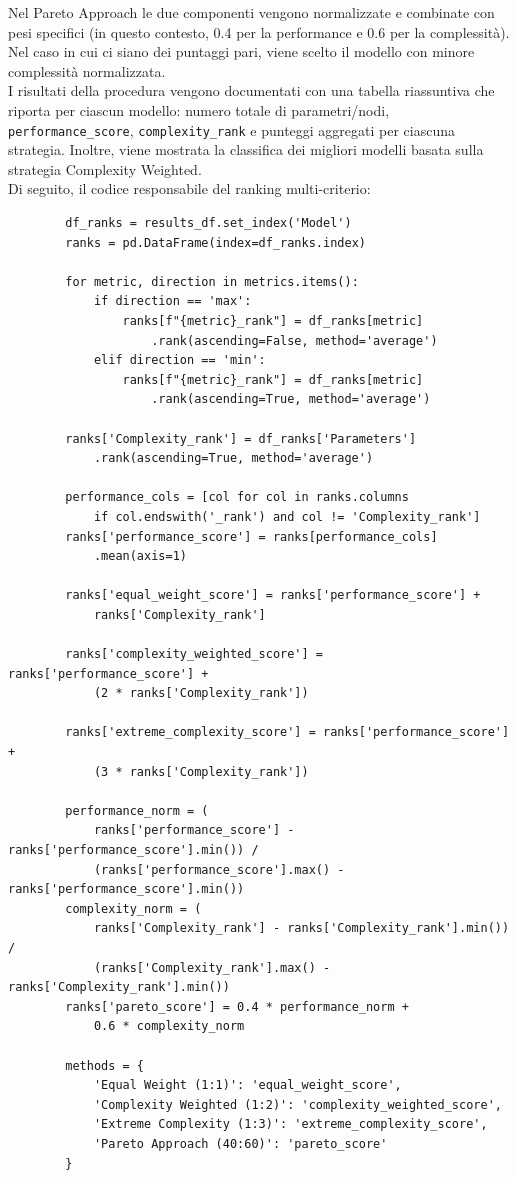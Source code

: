 \documentclass[a4paper,12pt]{report}
\begin{document}
	Nel Pareto Approach le due componenti vengono normalizzate e combinate con pesi specifici (in questo contesto, 0.4 per la performance e 0.6 per la complessità). \\
	Nel caso in cui ci siano dei puntaggi pari, viene scelto il modello con minore complessità normalizzata. \\
	I risultati della procedura vengono documentati con una tabella riassuntiva che riporta per ciascun modello: numero totale di parametri/nodi, \texttt{performance\_score}, \texttt{complexity\_rank} e punteggi aggregati per ciascuna strategia. Inoltre, viene mostrata la classifica dei migliori modelli basata sulla strategia Complexity Weighted.\\
	
	Di seguito, il codice responsabile del ranking multi-criterio:
	\begin{verbatim}
		df_ranks = results_df.set_index('Model')
		ranks = pd.DataFrame(index=df_ranks.index)
		
		for metric, direction in metrics.items():
			if direction == 'max':
				ranks[f"{metric}_rank"] = df_ranks[metric]
					.rank(ascending=False, method='average')
			elif direction == 'min':
				ranks[f"{metric}_rank"] = df_ranks[metric]
					.rank(ascending=True, method='average')
		
		ranks['Complexity_rank'] = df_ranks['Parameters']
			.rank(ascending=True, method='average')
		
		performance_cols = [col for col in ranks.columns 
			if col.endswith('_rank') and col != 'Complexity_rank']
		ranks['performance_score'] = ranks[performance_cols]
			.mean(axis=1)
		
		ranks['equal_weight_score'] = ranks['performance_score'] + 
			ranks['Complexity_rank']
		
		ranks['complexity_weighted_score'] = ranks['performance_score'] + 
			(2 * ranks['Complexity_rank'])
		
		ranks['extreme_complexity_score'] = ranks['performance_score'] + 
			(3 * ranks['Complexity_rank'])
		
		performance_norm = (
			ranks['performance_score'] - ranks['performance_score'].min()) / 
			(ranks['performance_score'].max() - ranks['performance_score'].min())
		complexity_norm = (
			ranks['Complexity_rank'] - ranks['Complexity_rank'].min()) / 
			(ranks['Complexity_rank'].max() - ranks['Complexity_rank'].min())
		ranks['pareto_score'] = 0.4 * performance_norm + 
			0.6 * complexity_norm
		
		methods = {
			'Equal Weight (1:1)': 'equal_weight_score',
			'Complexity Weighted (1:2)': 'complexity_weighted_score',
			'Extreme Complexity (1:3)': 'extreme_complexity_score',
			'Pareto Approach (40:60)': 'pareto_score'
		}
		

\end{verbatim}
\end{document}
